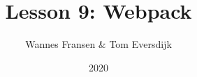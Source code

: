 \documentclass{beamer}
\title{Lesson 9: Webpack}
\author{Wannes Fransen \& Tom Eversdijk}
\institute{UC Leuven}
\date{2020}
\begin{document}
\frame{\titlepage}



\end{document}
